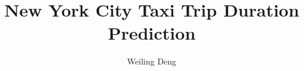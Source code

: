 \documentclass{amsart}
\begin{document}
%
%
\title[NYC Taxi Trip Duration Prediction]{New York City Taxi Trip Duration Prediction}%

\author{Weiling Deng}
\address[A.~1]{Business School,\\ 
Deakin University, Burwood 3125, Australia}%

%
\date{\gitAuthorDate}%




\maketitle
\tableofcontents

\newpage


\end{document}
